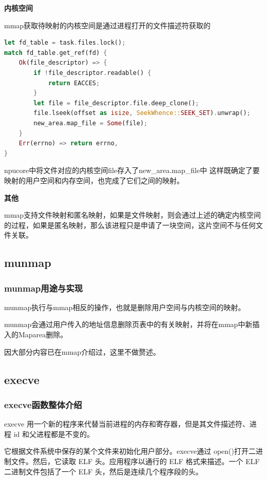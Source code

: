 \textbf{内核空间}

mmap获取待映射的内核空间是通过进程打开的文件描述符获取的
\begin{lstlisting}[language={Rust}, label={code:new_area},
	caption={os/src/mm/memory_set.rs}]
let fd_table = task.files.lock();
match fd_table.get_ref(fd) {
    Ok(file_descriptor) => {
        if !file_descriptor.readable() {
            return EACCES;
        }
        let file = file_descriptor.file.deep_clone();
        file.lseek(offset as isize, SeekWhence::SEEK_SET).unwrap();
        new_area.map_file = Some(file);
    }
    Err(errno) => return errno,
}
\end{lstlisting}
npucore中将文件对应的内核空间file存入了new\_area.map\_file中
这样既确定了要映射的用户空间和内存空间，也完成了它们之间的映射。

\textbf{其他}

mmap支持文件映射和匿名映射，如果是文件映射，则会通过上述的确定内核空间的过程，如果是匿名映射，那么该进程只是申请了一块空间，这片空间不与任何文件关联。

\subsection{munmap}

\subsubsection{munmap用途与实现}
munmap执行与mmap相反的操作，也就是删除用户空间与内核空间的映射。

munmap会通过用户传入的地址信息删除页表中的有关映射，并将在mmap中新插入的Maparea删除。

因大部分内容已在mmap介绍过，这里不做赘述。

\subsection{execve}
\subsubsection{execve函数整体介绍}
execve 用一个新的程序来代替当前进程的内存和寄存器，但是其文件描述符、进程 id 和父进程都是不变的。

它根据文件系统中保存的某个文件来初始化用户部分。execve通过 open()打开二进制文件。然后，它读取 ELF 头。应用程序以通行的 ELF 格式来描述。一个 ELF 二进制文件包括了一个 ELF 头，然后是连续几个程序段的头。

